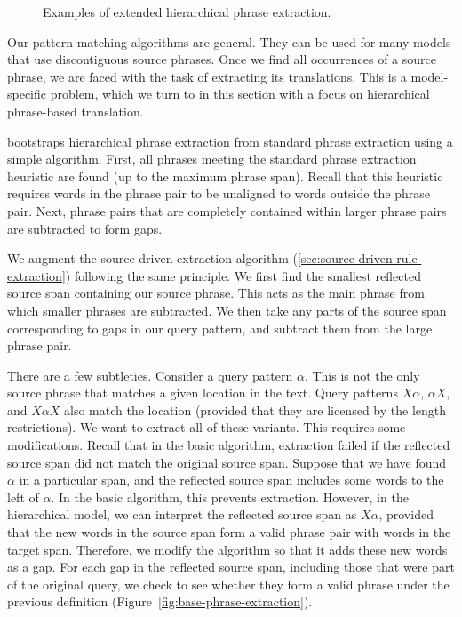 \figpreamble
\begin{figure}
	\figfontsize{
	\begin{center}
		
	\end{center}}
	\figpostamble
	\caption{Examples of extended hierarchical phrase extraction.}
	\label{fig:extended-phrase-extraction}
\end{figure}

Our pattern matching algorithms
are general.  They can be used for many models that use discontiguous
source phrases.  Once we find all occurrences of a source
phrase, we are faced with the task of extracting its 
translations.  This is a model-specific problem, which we turn
to in this section with a focus on hierarchical phrase-based
translation.

\citet{Chiang:2005:acl,Chiang:2007:cl}
bootstraps hierarchical phrase extraction from standard phrase
extraction using a simple algorithm.  First, all phrases
meeting the standard phrase extraction heuristic are found 
(up to the maximum phrase span).
Recall that this heuristic requires words in the
phrase pair to be unaligned to words outside the phrase pair.
Next, phrase pairs that are completely contained within larger 
phrase pairs are subtracted to form gaps.

We augment the source-driven extraction algorithm 
(\textsection\ref{sec:source-driven-rule-extraction}) 
following the same principle.  We first find the smallest 
reflected source span containing our source phrase.  This 
acts as the main phrase from which smaller phrases are subtracted.  
We then take any parts of the source span
corresponding to gaps in our query pattern, and subtract them
from the large phrase pair.  

There are a few subtleties.  
Consider a query pattern $\alpha$.  This is not
the only source phrase that matches a given location in the text.
Query patterns $X\alpha$, $\alpha{}X$, and $X\alpha{}X$ also match
the location (provided that they are licensed by the length restrictions).  
We want to extract all of these variants.  This
requires some modifications.  Recall that in the basic algorithm, 
extraction failed if the reflected source span did not match the original source span.
Suppose that we have found $\alpha$ in a particular span, and the
reflected source span includes some words to the left of $\alpha$.
In the basic algorithm, this prevents extraction.  However,
in the hierarchical model, we can interpret the reflected source span as 
$X\alpha$, provided that the new words in the source span 
form a valid phrase pair with words in the target span.  
Therefore, we modify the algorithm so that
it adds these new words as a gap.  For each gap in the reflected
source span, including those that were part of the original
query, we check to see whether they form a valid phrase under
the previous definition (Figure~\ref{fig:base-phrase-extraction}).

